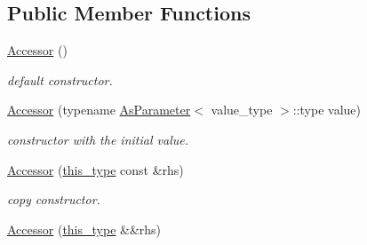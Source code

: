 \subsection*{Public Member Functions}
\begin{DoxyCompactItemize}
\item 
\hypertarget{classhryky_1_1atomic_1_1_accessor_ac90e3749014fa65dd80d8bcb9689b2aa}{\hyperlink{classhryky_1_1atomic_1_1_accessor_ac90e3749014fa65dd80d8bcb9689b2aa}{Accessor} ()}\label{classhryky_1_1atomic_1_1_accessor_ac90e3749014fa65dd80d8bcb9689b2aa}

\begin{DoxyCompactList}\small\item\em default constructor. \end{DoxyCompactList}\item 
\hyperlink{classhryky_1_1atomic_1_1_accessor_a2a792c96c311ba6f9225c64e0d8f17ee}{Accessor} (typename \hyperlink{classhryky_1_1_as_parameter}{As\-Parameter}$<$ value\-\_\-type $>$\-::type value)
\begin{DoxyCompactList}\small\item\em constructor with the initial value. \end{DoxyCompactList}\item 
\hyperlink{classhryky_1_1atomic_1_1_accessor_a6cd3ef60e539175db99a01f33a77bded}{Accessor} (\hyperlink{classhryky_1_1atomic_1_1_accessor_a4957c9dc8163f5fb426f5eb8de5fcd12}{this\-\_\-type} const \&rhs)
\begin{DoxyCompactList}\small\item\em copy constructor. \end{DoxyCompactList}\item 
\hypertarget{group__atomic__operation_ga3af8cf4027ed397ac63bd9cacb21b914}{\hyperlink{group__atomic__operation_ga3af8cf4027ed397ac63bd9cacb21b914}{Accessor} (\hyperlink{classhryky_1_1atomic_1_1_accessor_a4957c9dc8163f5fb426f5eb8de5fcd12}{this\-\_\-type} \&\&rhs)}\label{group__atomic__operation_ga3af8cf4027ed397ac63bd9cacb21b914}


\end{DoxyCompactItemize}
